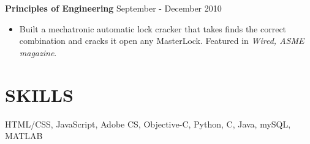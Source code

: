 \documentclass[margin]{res}
\begin{document}
%		

{\bf 	Principles of Engineering} \hfill September - December 2010\
\smallskip
	\begin{itemize}  \itemsep -4pt %
		
	\item Built a mechatronic automatic lock cracker that takes finds the correct combination and cracks it open any MasterLock.  Featured in \emph{Wired, ASME magazine}.
	\end{itemize}
\vspace*{3mm}

\section{SKILLS}  HTML/CSS, JavaScript,  Adobe CS, Objective-C, Python, C, Java, mySQL, MATLAB
\end{document}
